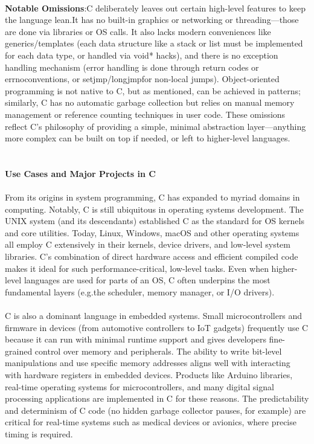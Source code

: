 \documentclass{article}
\begin{document}
\\
{\normalsize \textbf{Notable Omissions}}{\normalsize :}{\normalsize  }{\normalsize  C deliberately leaves out certain high-level features to keep the language lean.}{\normalsize  It has no built-in graphics or networking or threading—those are done via libraries or OS calls. It also lacks modern conveniences like generics/templates (each data structure like a stack or list must be implemented for each data type, or handled via voi}{\normalsize d* hacks), and there is no exception handling mechanism (error handling is done through return codes or }{\normalsize errno}{\normalsize  conventions, or }{\normalsize setjmp}{\normalsize /}{\normalsize longjmp}{\normalsize  for non-local jumps). Object-oriented programming is not native to C, but as mentioned, can be achieved in patterns}{\normalsize ; similarly, C has no automatic garbage collection but relies on manual memory management or reference }{\normalsize counting techniques in user code. These omissions reflect C's philosophy of providing a simple, minimal abstraction layer—anything more complex can be bu}{\normalsize ilt on top if needed, or left to higher-level languages.}\\
\\
\\
{\Large \textbf{Use Cases and Major Projects in C}}\\
\\
{\normalsize From its origins in system programming, C has expanded to myriad domains in computing. Notably, C is still ubiquitous in operating systems development. The UNIX sy}{\normalsize stem (and its descendants) established C as the standard for OS kernels and core utilities. Today, Linux, Windows, macOS and other operating systems all employ C extensively in their kernels, device drivers, and low-level system libraries. C's combination }{\normalsize of direct hardware access and efficient compiled code makes it ideal for such performance-critical, low-level tasks. Even when higher-level languages are used for parts of an OS, C often underpins the most fundamental layers (}{\normalsize e.g.}{\normalsize  the scheduler, memory man}{\normalsize ager, or I/O drivers).}\\
\\
{\normalsize C is also a dominant language in embedded systems. Small microcontrollers and firmware in devices (from automotive controllers to IoT gadgets) frequently use C because it can run with minimal runtime support and gives developers fin}{\normalsize e-grained control over memory and peripherals. The ability to write bit-level manipulations and use specific memory addresses aligns well with interacting with hardware registers in embedded devices. Products like Arduino libraries, real-time operating sys}{\normalsize tems for microcontrollers, and many digital signal processing applications are implemented in C for these reasons. The predictability and determinism of C code (no hidden garbage collector pauses, for example) are critical for real-time systems such as med}{\normalsize ical devices or avionics, where precise timing is required.}\\
\end{document}
